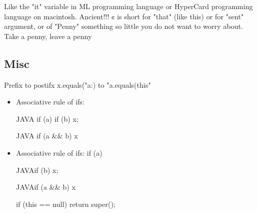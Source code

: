 Like the "it" variable in ML programming language or HyperCard programming language on macintosh. Ancient!!!
¢ is short for "that" (like this) or for "sent" argument, or of "Penny" something so little you do not want to worry about.
Take a penny, leave a penny

\subsection{Misc}
Prefix to postifx
x.equals("a:) to "a.equals(this"

\begin{itemize}
\item Associative rule of ifs: 
  \begin{code}{JAVA}
  if (a) if (b) x;
\end{code}
  \begin{code}{JAVA}
  if (a && b) x
  \end{code}
\item Associative rule of ifs: if (a) 
\begin{code}{JAVA}if (b) x;\end{code}
\begin{code}{JAVA}if (a && b) x\end{code}
\begin{java}
if (this == null) return super();
\end{java}
  
  \end{itemize}

